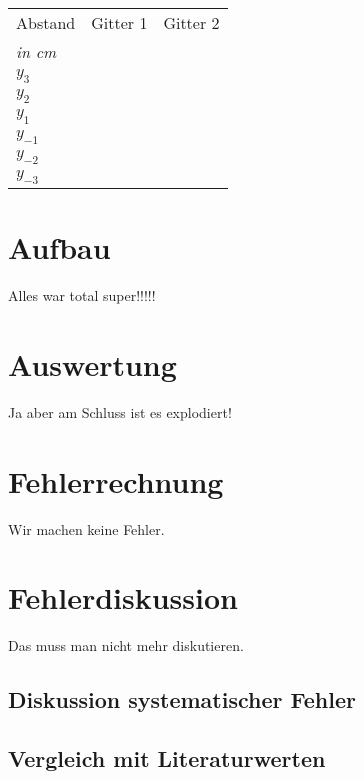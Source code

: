 \documentclass[12pt,a4paper,titlepage,headinclude,bibtotoc]{scrartcl}
\begin{document}
\begin{table}
\centering
\begin{large}

\end{large}
\begin{tabular}{|p{4 cm}||p{4 cm}|p{4 cm}|}
        \hline
          Abstand  & Gitter 1  & Gitter 2 \\
          \textit{in cm} & & \\
         
         
         \hline 
         $y_3 $& & \\
         \hline
         $y_2 $& & \\
         \hline
         $y_{1} $& & \\
         
         \hline
         $y_{-1}$& & \\
         \hline
         $y_{-2}$& & \\
         \hline             
         $y_{-3}$& & \\
         \hline
\end{tabular}
\end{table}


\section{Aufbau}
Alles war total super!!!!!


\section{Auswertung}

Ja aber am Schluss ist es explodiert!

\section{Fehlerrechnung}
Wir machen keine Fehler.


\section{Fehlerdiskussion}
Das muss man nicht mehr diskutieren.

\subsection{Diskussion systematischer Fehler}



\subsection{Vergleich mit Literaturwerten}
\end{document}
